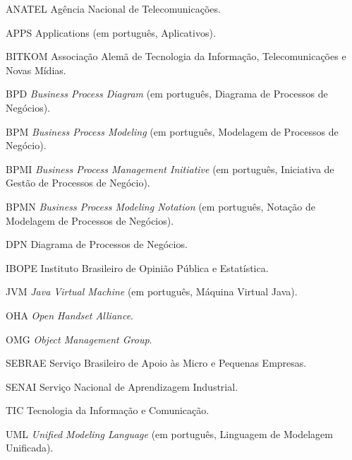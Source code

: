 
\begin{siglas}
  \item[ANATEL] Agência Nacional de Telecomunicações.
  \item[APPS] Applications (em português, Aplicativos).
  \item[BITKOM] Associação Alemã de Tecnologia da Informação, Telecomunicações e Novas Mídias.
  \item[BPD] \textit{Business Process Diagram} (em português, Diagrama de Processos de Negócios).
  \item[BPM] \textit{Business Process Modeling} (em português, Modelagem de Processos de Negócio).
  \item[BPMI] \textit{Business Process Management Initiative} (em português, Iniciativa de Gestão de Processos de Negócio).
  \item[BPMN] \textit{Business Process Modeling Notation} (em português, Notação de Modelagem de Processos de Negócios).
  \item[DPN] Diagrama de Processos de Negócios.
  \item[IBOPE] Instituto Brasileiro de Opinião Pública e Estatística.
  \item[JVM] \textit{Java Virtual Machine} (em português, Máquina Virtual Java).
  \item[OHA] \textit{Open Handset Alliance}.
  \item[OMG] \textit{Object Management Group}.
  \item[SEBRAE] Serviço Brasileiro de Apoio às Micro e Pequenas Empresas.
  \item[SENAI] Serviço Nacional de Aprendizagem Industrial.
  \item[TIC] Tecnologia da Informação e Comunicação.
  \item[UML] \textit{Unified Modeling Language} (em português, Linguagem de Modelagem Unificada).
   
\end{siglas}

